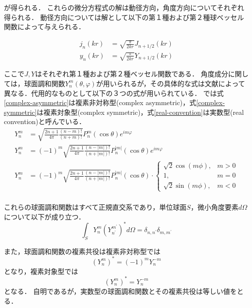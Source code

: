 \documentclass[a4paper]{jsarticle}
\begin{document}
が得られる．
これらの微分方程式の解は動径方向，角度方向についてそれぞれ得られる．
動径方向については解として以下の第１種および第２種球ベッセル関数によって与えられる．

\begin{align*}
    j_{n}(k r) & =\sqrt{\frac{\pi}{2 k r}} J_{n+1 / 2}(k r) \\
    y_{n}(k r) & =\sqrt{\frac{\pi}{2 k r}} Y_{n+1 / 2}(k r)
\end{align*}

ここで$J, Y$はそれぞれ第１種および第２種ベッセル関数である．
角度成分に関しては，球面調和関数$Y_{n}^{m}(\theta, \varphi)$が用いられるが，その具体的な式は文献によって異なる．代用的なものとして以下の３つの式が用いられている．
\cite{Andersson_undated-qg}では式\ref{complex-asymmetric}は複素非対称型(complex asymmetric)，式\ref{complex-symmetric}は複素対象型(complex symmetric)，式\ref{real-convention}は実数型(real convention)と呼んでいる．
\begin{align}
    Y_{n}^{m} & =\sqrt{\frac{2 n+1}{4 \pi} \frac{(n-m) !}{(n+m) !}} P_{n}^{m}(\cos \theta) e^{i m \varphi} \label{complex-asymmetric}                                          \\
    Y_{n}^{m} & =(-1)^{m} \sqrt{\frac{2 n+1}{4 \pi} \frac{(n-|m|) !}{(n+|m|) !}} P_{n}^{|m|}(\cos \theta) e^{i m \varphi}  \label{complex-symmetric}                           \\
    Y_{n}^{m} & =(-1)^{m} \sqrt{\frac{2 n+1}{4 \pi} \frac{(n-|m|) !}{(n+|m|) !}} P_{n}^{|m|}(\cos \theta) \cdot \left\{\begin{array}{ll}
        \sqrt{2} \cos (m \phi), & m>0 \\
        1,                      & m=0 \\
        \sqrt{2} \sin (m \phi), & m<0
    \end{array}\right.\label{real-convention} \\
\end{align}

これらの球面調和関数はすべて正規直交系であり，単位球面$S$，微小角度要素$d\Omega$について以下が成り立つ．
$$
    \int_{S} Y_{n}^{m}\left(Y_{n^{\prime}}^{m^{\prime}}\right)^{*} d \Omega=\delta_{n, n^{\prime}} \delta_{m, m^{\prime}}
$$

また，球面調和関数の複素共役は複素非対称型では
$$
    \left(Y_{n}^{m}\right)^{*}=(-1)^{m} Y_{n}^{-m}
$$
となり，複素対象型では
$$
    \left(Y_{n}^{m}\right)^{*}=Y_{n}^{-m}
$$
となる．
自明であるが，実数型の球面調和関数とその複素共役は等しい値をとる．
\end{document}
